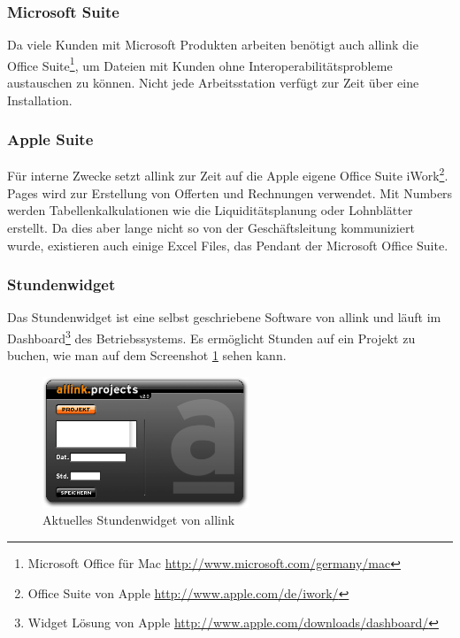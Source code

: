 \subsubsection{Microsoft Suite}
Da viele Kunden mit Microsoft Produkten arbeiten benötigt auch allink die
Office Suite\footnote{Microsoft Office für Mac \url{http://www.microsoft.com/germany/mac}}, 
um Dateien mit Kunden ohne Interoperabilitätsprobleme
austauschen zu können. Nicht jede Arbeitsstation verfügt zur Zeit über eine
Installation.

\subsubsection{Apple Suite}
Für interne Zwecke setzt allink zur Zeit auf die Apple eigene Office Suite
iWork\footnote{Office Suite von Apple \url{http://www.apple.com/de/iwork/}}.
Pages wird zur Erstellung von Offerten und Rechnungen verwendet. Mit Numbers
werden Tabellenkalkulationen wie die Liquiditätsplanung oder Lohnblätter erstellt.
Da dies aber lange nicht so von der Geschäftsleitung kommuniziert wurde, existieren
auch einige Excel Files, das Pendant der Microsoft Office Suite.

\subsubsection{Stundenwidget}
Das Stundenwidget ist eine selbst geschriebene Software von allink und läuft
im Dashboard\footnote{Widget Lösung von Apple \url{http://www.apple.com/downloads/dashboard/}} des Betriebssystems.
Es ermöglicht Stunden auf ein Projekt zu buchen, wie man auf dem Screenshot \ref{pic:ist_widget}
sehen kann.

\begin{figure}[htbp]
\begin{center}
\includegraphics[width=0.55\textwidth,angle=0]{./bilder/ist_widget.png}
\caption{Aktuelles Stundenwidget von allink}
\label{pic:ist_widget}
\end{center}
\end{figure}

